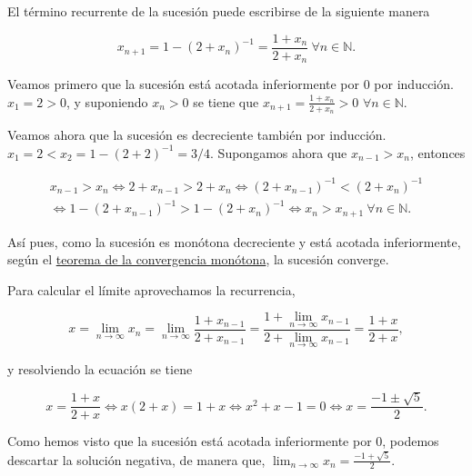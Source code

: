\documentclass[
  spanish,
  a4paper,
]{scrreport}
\theoremstyle{definition}
\theoremstyle{remark}
\begin{document}
\begin{tcolorbox}[enhanced jigsaw, arc=.35mm, bottomrule=.15mm, bottomtitle=1mm, breakable, colback=white, colbacktitle=quarto-callout-tip-color!10!white, colframe=quarto-callout-tip-color-frame, coltitle=black, left=2mm, leftrule=.75mm, opacityback=0, opacitybacktitle=0.6, rightrule=.15mm, title=\textcolor{quarto-callout-tip-color}{\faLightbulb}\hspace{0.5em}{Solución}, titlerule=0mm, toprule=.15mm, toptitle=1mm]

El término recurrente de la sucesión puede escribirse de la siguiente
manera

\[
x_{n+1}=1-(2+x_n)^{-1} = \frac{1+x_n}{2+x_n}\ \forall n\in\mathbb{N}.
\]

Veamos primero que la sucesión está acotada inferiormente por \(0\) por
inducción. \(x_1=2>0\), y suponiendo \(x_n>0\) se tiene que
\(x_{n+1} = \frac{1+x_n}{2+x_n} >0\) \(\forall n\in\mathbb{N}\).

Veamos ahora que la sucesión es decreciente también por inducción.
\(x_1 = 2 < x_2 = 1-(2+2)^{-1} = 3/4\). Supongamos ahora que
\(x_{n-1}>x_n\), entonces

\[
\begin{gathered}
x_{n-1}>x_n \Leftrightarrow 2+x_{n-1} > 2+x_n \Leftrightarrow (2+x_{n-1})^{-1} < (2+x_n)^{-1} \\
\Leftrightarrow 1-(2+x_{n-1})^{-1} > 1-(2+x_n)^{-1} \Leftrightarrow x_{n}>x_{n+1}\ \forall n\in\mathbb{N}.
\end{gathered}
\]

Así pues, como la sucesión es monótona decreciente y está acotada
inferiormente, según el
\href{https://aprendeconalf.es/analisis-manual/sucesiones.html\#thm-convergencia-monotona}{teorema
de la convergencia monótona}, la sucesión converge.

Para calcular el límite aprovechamos la recurrencia,

\[
x = \lim_{n\to\infty}x_n = \lim_{n\to\infty} \frac{1+x_{n-1}}{2+x_{n-1}} =\frac{1+\lim_{n\to\infty}x_{n-1}}{2+\lim_{n\to\infty}x_{n-1}} = \frac{1+x}{2+x},
\]

y resolviendo la ecuación se tiene

\[
x = \frac{1+x}{2+x} \Leftrightarrow x(2+x) = 1+x \Leftrightarrow x^2+x-1=0 \Leftrightarrow x = \frac{-1\pm \sqrt{5}}{2}.
\]

Como hemos visto que la sucesión está acotada inferiormente por \(0\),
podemos descartar la solución negativa, de manera que,
\(\lim_{n\to\infty}x_n = \frac{-1+ \sqrt{5}}{2}\).

\end{tcolorbox}
\end{document}
